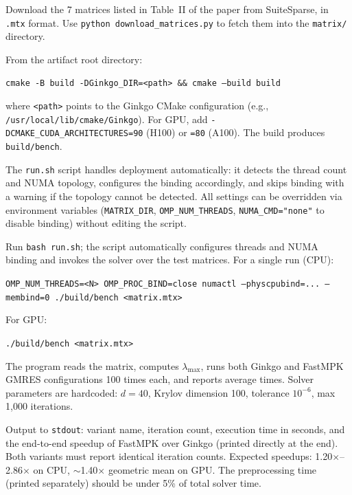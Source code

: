 \documentclass[conference]{IEEEtran}
\begin{document}

Download the 7 matrices listed in Table~II of the paper from SuiteSparse, in \texttt{.mtx} format. Use \texttt{python download\_matrices.py} to fetch them into the \texttt{matrix/} directory.


From the artifact root directory:
\begin{center}
\texttt{cmake -B build -DGinkgo\_DIR=<path> \&\& cmake --build build}
\end{center}
where \texttt{<path>} points to the Ginkgo CMake configuration (e.g., \texttt{/usr/local/lib/cmake/Ginkgo}). For GPU, add \texttt{-DCMAKE\_CUDA\_ARCHITECTURES=90} (H100) or \texttt{=80} (A100). The build produces \texttt{build/bench}.


The \texttt{run.sh} script handles deployment automatically: it detects the thread count and NUMA topology, configures the binding accordingly, and skips binding with a warning if the topology cannot be detected. All settings can be overridden via environment variables (\texttt{MATRIX\_DIR}, \texttt{OMP\_NUM\_THREADS}, \texttt{NUMA\_CMD="none"} to disable binding) without editing the script.

\artcomp

Run \texttt{bash run.sh}; the script automatically configures threads and NUMA binding and invokes the solver over the test matrices. For a single run (CPU):
\begin{center}
\texttt{OMP\_NUM\_THREADS=<N> OMP\_PROC\_BIND=close numactl --physcpubind=... --membind=0 ./build/bench <matrix.mtx>}
\end{center}
For GPU:
\begin{center}
\texttt{./build/bench <matrix.mtx>}
\end{center}
The program reads the matrix, computes $\lambda_{\max}$, runs both Ginkgo and FastMPK GMRES configurations 100 times each, and reports average times. Solver parameters are hardcoded: $d=40$, Krylov dimension 100, tolerance $10^{-6}$, max 1,000 iterations.

\artout

Output to \texttt{stdout}: variant name, iteration count, execution time in seconds, and the end-to-end speedup of FastMPK over Ginkgo (printed directly at the end). Both variants must report identical iteration counts. Expected speedups: 1.20$\times$--2.86$\times$ on CPU, $\sim$1.40$\times$ geometric mean on GPU. The preprocessing time (printed separately) should be under 5\% of total solver time.
\end{document}
